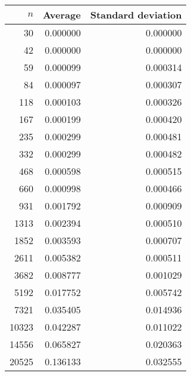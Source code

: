 \begin {tabular}{rrr}
$n$ & Average & Standard deviation\\ \hline 
30 & 0.000000 & 0.000000\\ 
42 & 0.000000 & 0.000000\\ 
59 & 0.000099 & 0.000314\\ 
84 & 0.000097 & 0.000307\\ 
118 & 0.000103 & 0.000326\\ 
167 & 0.000199 & 0.000420\\ 
235 & 0.000299 & 0.000481\\ 
332 & 0.000299 & 0.000482\\ 
468 & 0.000598 & 0.000515\\ 
660 & 0.000998 & 0.000466\\ 
931 & 0.001792 & 0.000909\\ 
1313 & 0.002394 & 0.000510\\ 
1852 & 0.003593 & 0.000707\\ 
2611 & 0.005382 & 0.000511\\ 
3682 & 0.008777 & 0.001029\\ 
5192 & 0.017752 & 0.005742\\ 
7321 & 0.035405 & 0.014936\\ 
10323 & 0.042287 & 0.011022\\ 
14556 & 0.065827 & 0.020363\\ 
20525 & 0.136133 & 0.032555\\ 
\end{tabular}
